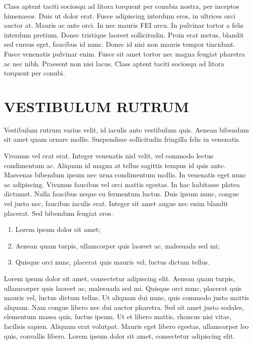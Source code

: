 \documentclass[xindy,acronym,symbols]{fei}
\begin{document}
Class aptent taciti sociosqu ad litora torquent per conubia nostra, per inceptos himenaeos. Duis ut dolor erat. Fusce adipiscing interdum eros, in ultrices orci auctor at. Mauris ac ante orci. In nec mauris FEI arcu. In pulvinar tortor a felis interdum pretium. Donec tristique laoreet sollicitudin. Proin erat metus, blandit sed cursus eget, faucibus id nunc. Donec id nisi non mauris tempor tincidunt. Fusce venenatis pulvinar enim. Fusce sit amet tortor nec magna feugiat pharetra ac nec nibh. Praesent non nisi lacus. Class aptent taciti sociosqu ad litora torquent per conubi.

\chapter{VESTIBULUM RUTRUM}

Vestibulum rutrum varius velit, id iaculis ante vestibulum quis. Aenean bibendum sit amet quam ornare mollis. Suspendisse sollicitudin fringilla felis in venenatis.

Vivamus vel erat erat. Integer venenatis nisl velit, vel commodo lectus condimentum ac. Aliquam id magna at tellus sagittis tempus id quis ante. Maecenas bibendum ipsum nec urna condimentum mollis. In venenatis eget nunc ac adipiscing. Vivamus faucibus vel orci mattis egestas. In hac habitasse platea dictumst. Nulla faucibus neque eu fermentum luctus. Duis ipsum nunc, congue vel justo nec, faucibus iaculis erat. Integer sit amet augue nec enim blandit placerat. Sed bibendum feugiat eros.

\begin{enumerate}
	\item Lorem ipsum dolor sit amet;
	\item Aenean quam turpis, ullamcorper quis laoreet ac, malesuada sed mi;
	\item Quisque orci nunc, placerat quis mauris vel, luctus dictum tellus.
\end{enumerate}

Lorem ipsum dolor sit amet, consectetur adipiscing elit. Aenean quam turpis, ullamcorper quis laoreet ac, malesuada sed mi. Quisque orci nunc, placerat quis mauris vel, luctus dictum tellus. Ut aliquam dui nunc, quis commodo justo mattis aliquam. Nam congue libero nec dui auctor pharetra. Sed sit amet justo sodales, elementum massa quis, luctus ipsum. Ut et libero mattis, rhoncus nisi vitae, facilisis sapien. Aliquam erat volutpat. Mauris eget libero egestas, ullamcorper leo quis, convallis libero. Lorem ipsum dolor sit amet, consectetur adipiscing elit.
\end{document}
